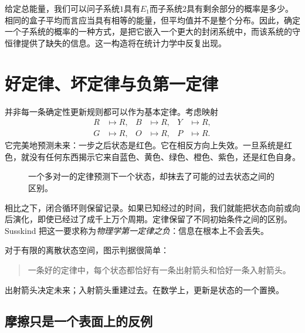 给定总能量，我们可以问子系统\(1\)具有\(E_1\)而子系统\(2\)具有剩余部分的概率是多少。相同的盒子平均而言应当具有相等的能量，但平均值并不是整个分布。因此，确定一个子系统的概率的一种方式，是把它嵌入一个更大的封闭系统中，而该系统的守恒律提供了缺失的信息。这一构造将在统计力学中反复出现。

\section{好定律、坏定律与负第一定律}

并非每一条确定性更新规则都可以作为基本定律。考虑映射
\begin{equation}
 \begin{aligned}
 R&\mapsto R,& B&\mapsto R,& Y&\mapsto R,\\
 G&\mapsto R,& O&\mapsto R,& P&\mapsto R.
 \end{aligned}
 \label{eq:sm1-all-to-red}
\end{equation}
它完美地预测未来：一步之后状态是红色。它在相反方向上失效。一旦系统是红色，就没有任何东西揭示它来自蓝色、黄色、绿色、橙色、紫色，还是红色自身。

\begin{figure}[htbp]
\centering
{}
\caption{一个多对一的定律预测下一个状态，却抹去了可能的过去状态之间的区别。}
\label{fig:sm1-bad-law}
\end{figure}

相比之下，闭合循环则保留记录。如果已知经过的时间，我们就能把状态向前或向后演化，即使已经过了成千上万个周期。定律保留了不同初始条件之间的区别。Susskind 把这一要求称为\emph{物理学第一定律之负}：信息在根本上不会丢失。

对于有限的离散状态空间，图示判据很简单：
\begin{quote}
一条好的定律中，每个状态都恰好有一条出射箭头和恰好一条入射箭头。
\end{quote}
出射箭头决定未来；入射箭头重建过去。在数学上，更新是状态的一个置换。

\subsection{摩擦只是一个表面上的反例}

